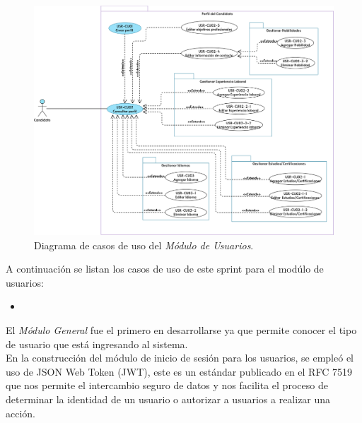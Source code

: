     \begin{figure}[H]
        \begin{center}
            \includegraphics[width=.7\textwidth]{sprints/imagenes/CUPUSR.png}
        \end{center}
        \caption{Diagrama de casos de uso del \textit{Módulo de Usuarios}.}
        \label{dcu:CUPUSR}
    \end{figure}

    A continuación se listan los casos de uso de este sprint para el modúlo de usuarios:
    \begin{itemize}
        \item {}
    \end{itemize} 

        El \textit{Módulo General} fue el primero en desarrollarse ya que permite conocer el tipo de usuario
        que está ingresando al sistema.\\ 
        \newline        
        En la construcción del módulo de inicio de sesión para los usuarios, se empleó el uso de JSON Web Token (JWT), este es un 
        estándar publicado en el RFC 7519 que nos permite el intercambio seguro de datos y nos facilita el proceso de determinar la 
        identidad de un usuario o autorizar a usuarios a realizar una acción.

